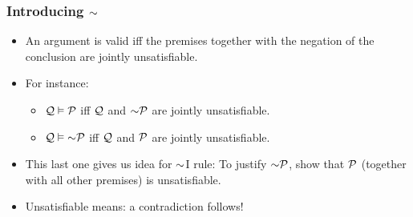 \begin{frame}
  \frametitle{Introducing $\enot$}

  \begin{itemize}[<+->]
    \item An argument is valid iff the premises
    together with the negation of the conclusion are jointly
    unsatisfiable.
    \item For instance:
    \begin{itemize}[<+->]
      \item $\mathcal{Q} \vDash \mathcal{P}$ iff
      $\mathcal{Q}$ and $\enot\metav{P}$ are jointly unsatisfiable.
      \item $\metav{Q} \entails \enot\metav{P}$ iff
      $\mathcal{Q}$ and $\mathcal{P}$ are jointly unsatisfiable.
    \end{itemize}
    \item This last one gives us idea for $\enot$I rule: To justify
    $\enot\metav{P}$, show that $\mathcal{P}$ (together with all other
    premises) is unsatisfiable.
    \item Unsatisfiable means: a contradiction follows!
  \end{itemize}
\end{frame}

